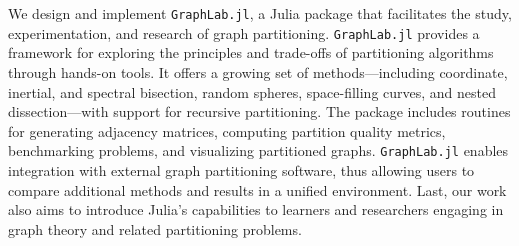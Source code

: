 \documentclass[../paper.tex]{subfiles}
\begin{document}
    We design and implement \texttt{GraphLab.jl}, a Julia package
    that facilitates the study, experimentation, and research of
    graph partitioning. \texttt{GraphLab.jl} provides a framework
    for exploring the principles and trade-offs of partitioning
    algorithms through hands-on tools. It offers a growing set
    of methods—including coordinate, inertial, and spectral
    bisection, random spheres, space-filling curves, and nested
    dissection—with support for recursive partitioning. The
    package includes routines for generating adjacency matrices, 
    computing partition quality metrics, benchmarking problems,
    and visualizing partitioned graphs. \texttt{GraphLab.jl}
    enables integration with external graph partitioning software,
    thus allowing users to compare additional methods and results
    in a unified environment. Last, our work also aims to introduce
    Julia's capabilities to learners and researchers engaging in
    graph theory and related partitioning problems.
\end{document}

